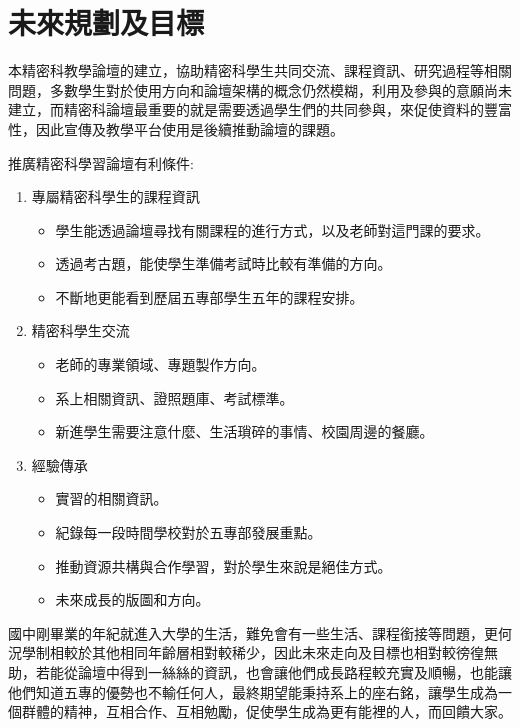\chapter{未來規劃及目標}
\renewcommand{\baselinestretch}{10} %
\par
\renewcommand{\baselinestretch}{1} %
\twelve 本精密科教學論壇的建立，協助精密科學生共同交流、課程資訊、研究過程等相關問題，多數學生對於使用方向和論壇架構的概念仍然模糊，利用及參與的意願尚未建立，而精密科論壇最重要的就是需要透過學生們的共同參與，來促使資料的豐富性，因此宣傳及教學平台使用是後續推動論壇的課題。
\\
\par
\renewcommand{\baselinestretch}{1} %
\twelve 推廣精密科學習論壇有利條件:
\par
\begin{enumerate}
	\item 專屬精密科學生的課程資訊
	\begin{itemize}
		\item 學生能透過論壇尋找有關課程的進行方式，以及老師對這門課的要求。
		\item 透過考古題，能使學生準備考試時比較有準備的方向。
		\item 不斷地更能看到歷屆五專部學生五年的課程安排。
	\end{itemize}
	\item 精密科學生交流
	\begin{itemize}
		\item 老師的專業領域、專題製作方向。
		\item 系上相關資訊、證照題庫、考試標準。
		\item 新進學生需要注意什麼、生活瑣碎的事情、校園周邊的餐廳。
	\end{itemize}
	\item 經驗傳承
	\begin{itemize}
		\item 實習的相關資訊。
		\item 紀錄每一段時間學校對於五專部發展重點。
		\item 推動資源共構與合作學習，對於學生來說是絕佳方式。
		\item 未來成長的版圖和方向。
	\end{itemize}
\end{enumerate}
\par
\renewcommand{\baselinestretch}{1} %
\twelve 國中剛畢業的年紀就進入大學的生活，難免會有一些生活、課程銜接等問題，更何況學制相較於其他相同年齡層相對較稀少，因此未來走向及目標也相對較徬徨無助，若能從論壇中得到一絲絲的資訊，也會讓他們成長路程較充實及順暢，也能讓他們知道五專的優勢也不輸任何人，最終期望能秉持系上的座右銘，讓學生成為一個群體的精神，互相合作、互相勉勵，促使學生成為更有能裡的人，而回饋大家。
\par
